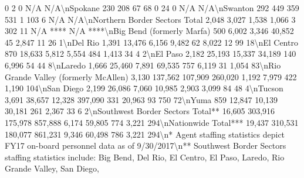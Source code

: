 \documentclass[
]{krantz}
\makeatletter
\newenvironment{Shaded}{\begin{snugshade}}{\end{snugshade}}
\newenvironment{kframe}{%
\medskip{}
\setlength{\fboxsep}{.8em}
 \def\at@end@of@kframe{}%
 \ifinner\ifhmode%
  \def\at@end@of@kframe{\end{minipage}}%
  \begin{minipage}{\columnwidth}%
 \fi\fi%
 \def\FrameCommand##1{\hskip\@totalleftmargin \hskip-\fboxsep
 \colorbox{shadecolor}{##1}\hskip-\fboxsep
     \hskip-\linewidth \hskip-\@totalleftmargin \hskip\columnwidth}%
 \MakeFramed {\advance\hsize-\width
   \@totalleftmargin\z@ \linewidth\hsize
   \@setminipage}}%
 {\par\unskip\endMakeFramed%
 \at@end@of@kframe}
\renewenvironment{Shaded}{\begin{kframe}}{\end{kframe}}
\makeatother
\begin{document}
\begin{Shaded}
\begin{Highlighting}[]
0                2               0              N/A      N/A\textbackslash{}nSpokane                                           230                208                       67                     68                 0               24               0              N/A      N/A\textbackslash{}nSwanton                                           292               449                       359                    531                 1               103               6             N/A      N/A\textbackslash{}nNorthern Border Sectors Total                    2,048             3,027                     1,538                  1,066                3               302              11        N/A ****    N/A   ****\textbackslash{}nBig Bend (formerly Marfa)                         500              6,002                     3,346                  40,852              45              2,847             11             26       1\textbackslash{}nDel Rio                                          1,391             13,476                    6,156                  9,482               62              8,022             12             99       18\textbackslash{}nEl Centro                                         870              18,633                    5,812                  5,554              484              1,413             34             4        2\textbackslash{}nEl Paso                                          2,182             25,193                   15,337                  34,189             140              6,996             54             44       8\textbackslash{}nLaredo                                           1,666             25,460                    7,891                  69,535             757              6,119             31            1,054     83\textbackslash{}nRio Grande Valley (formerly McAllen)             3,130            137,562                  107,909                 260,020            1,192             7,979            422            1,190    104\textbackslash{}nSan Diego                                        2,199             26,086                    7,060                  10,985            2,903             3,099             84             48       4\textbackslash{}nTucson                                           3,691             38,657                   12,328                 397,090             331             20,963             93            750       72\textbackslash{}nYuma                                              859              12,847                   10,139                  30,181             261              2,367             33             6        2\textbackslash{}nSouthwest Border Sectors Total**                16,605            303,916                  175,978                 857,888            6,174            59,805            774            3,221    294\textbackslash{}nNationwide Total***                             19,437            310,531                  180,077                 861,231            9,346            60,498            786            3,221    294\textbackslash{}n* Agent staffing statistics depict FY17 on{-}board personnel data as of 9/30/2017\textbackslash{}n** Southwest Border Sectors staffing statistics include: Big Bend, Del Rio, El Centro, El Paso, Laredo, Rio Grande Valley, San Diego, 
\end{Highlighting}
\end{Shaded}
\end{document}
